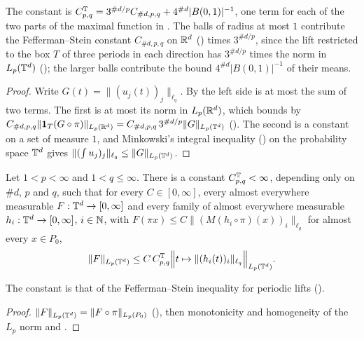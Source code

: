 The constant is $C^{\mathbb{T}}_{p,q} = 3^{\#d/p} C_{\#d,p,q} + 4^{\#d} |B(0,1)|^{-1}$, one term for
each of the two parts of the maximal function in . The
balls of radius at most $1$ contribute the Fefferman--Stein constant $C_{\#d,p,q}$ on $\mathbb{R}^d$
() times $3^{\#d/p}$, since the lift restricted to the box $T$ of three
periods in each direction has $3^{\#d/p}$ times the norm in $L_p(\mathbb{T}^d)$
(); the larger balls contribute the bound $4^{\#d} |B(0,1)|^{-1}$ of
their means.

\begin{proof}
\leanok
Write $G(t) = \|(u_j(t))_j\|_{\ell_q}$. By  the left side is
at most the sum of two terms. The first is at most its norm in $L_p(\mathbb{R}^d)$, which
 bounds by $C_{\#d,p,q} \|\mathbf 1_T (G \circ \pi)\|_{L_p(\mathbb{R}^d)}
= C_{\#d,p,q} \, 3^{\#d/p} \|G\|_{L_p(\mathbb{T}^d)}$ (). The second is a
constant on a set of measure $1$, and Minkowski's integral inequality
() on the probability space $\mathbb{T}^d$
gives $\|(\int u_j)_j\|_{\ell_q} \leq \|G\|_{L_p(\mathbb{T}^d)}$.
\end{proof}

\begin{lemma}
\label{lem:torus-maximal-bounds-mixed-norm}
\leanok
{}
Let $1 < p < \infty$ and $1 < q \leq \infty$. There is a constant $C^{\mathbb{T}}_{p,q} < \infty$,
depending only on $\#d$, $p$ and $q$, such that for every $C \in [0, \infty]$, every almost
everywhere measurable $F : \mathbb{T}^d \to [0, \infty]$ and every family of almost everywhere measurable
$h_i : \mathbb{T}^d \to [0, \infty]$, $i \in \mathbb{N}$, with
$F(\pi x) \leq C \|(M(h_i \circ \pi)(x))_i\|_{\ell_q}$ for almost every $x \in P_0$,
\[
  \|F\|_{L_p(\mathbb{T}^d)} \leq C \, C^{\mathbb{T}}_{p,q} \Bigl\| t \mapsto \|(h_i(t))_i\|_{\ell_q}
  \Bigr\|_{L_p(\mathbb{T}^d)} .
\]
\end{lemma}

The constant is that of the Fefferman--Stein inequality for periodic lifts
().

\begin{proof}
\leanok
$\|F\|_{L_p(\mathbb{T}^d)} = \|F \circ \pi\|_{L_p(P_0)}$ (), then
monotonicity and homogeneity of the $L_p$ norm and .
\end{proof}

